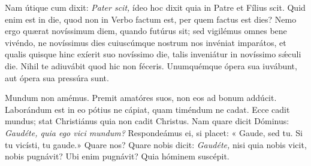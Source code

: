{\noindent Nam útique cum dixit: \emph{Pater scit,} ídeo hoc dixit quia in Patre et Fílius scit. Quid enim est in die, quod non in Verbo factum est, per quem factus est dies? Nemo ergo quærat novíssimum diem, quando futúrus sit; sed vigilémus omnes bene vivéndo, ne novíssimus dies cuiuscúmque nostrum nos invéniat imparátos, et qualis quisque hinc exíerit suo novíssimo die, talis inveniátur in novíssimo sǽculi die. Nihil te adiuvábit quod hic non féceris. Unumquémque ópera sua iuvábunt, aut ópera sua pressúra sunt.

\noindent Mundum non amémus. Premit amatóres suos, non eos ad bonum addúcit. Laborándum est in eo pótius ne cápiat, quam timéndum ne cadat. Ecce cadit mundus; stat Christiánus quia non cadit Christus. Nam quare dicit Dóminus: \emph{Gaudéte, quia ego vici mundum?} Respondeámus ei, si placet: « Gaude, sed tu. Si tu vicísti, tu gaude.» Quare nos? Quare nobis dicit: \emph{Gaudéte,} nisi quia nobis vicit, nobis pugnávit? Ubi enim pugnávit? Quia hóminem suscépit.

\vfill
\pagebreak

 

\vspace{-5mm}


\vfill
\pagebreak
}
\newcommand{\responsoriumbreve}{\pars{Responsorium breve.}

\cuminitiali{VI}{temporalia/resp-christefilidei.gtex}}
\newcommand{\benedictus}{\pars{Canticum Zachariæ.} \scriptura{Mt. 24, 32-33; Cf. Mc. 13, 28-29}

\vspace{-6mm}

\antiphona{VIII G}{temporalia/ant-abarboreautemfici.gtex}

\vspace{-1mm}

\scriptura{Lc. 1, 68-79}

\vspace{-3mm}

\cantusSineNeumas
\initiumpsalmi{temporalia/benedictus-initium-viiisoll-G-auto.gtex}

\vspace{-1.5mm}

 \Abardot{}}


